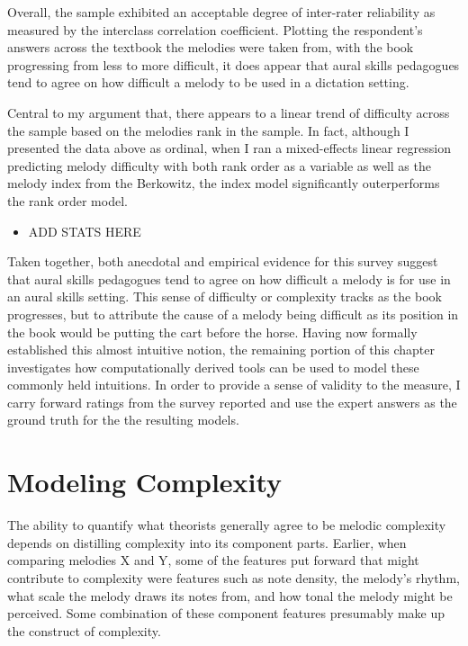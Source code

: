 \documentclass[]{book}
\providecommand{\tightlist}{%
  \setlength{\itemsep}{0pt}\setlength{\parskip}{0pt}}
\begin{document}
Overall, the sample exhibited an acceptable degree of inter-rater reliability as measured by the interclass correlation coefficient.
Plotting the respondent's answers across the textbook the melodies were taken from, with the book progressing from less to more difficult, it does appear that aural skills pedagogues tend to agree on how difficult a melody to be used in a dictation setting.

Central to my argument that, there appears to a linear trend of difficulty across the sample based on the melodies rank in the sample.
In fact, although I presented the data above as ordinal, when I ran a mixed-effects linear regression predicting melody difficulty with both rank order as a variable as well as the melody index from the Berkowitz, the index model significantly outerperforms the rank order model.

\begin{itemize}
\tightlist
\item
  ADD STATS HERE
\end{itemize}

Taken together, both anecdotal and empirical evidence for this survey suggest that aural skills pedagogues tend to agree on how difficult a melody is for use in an aural skills setting.
This sense of difficulty or complexity tracks as the book progresses, but to attribute the cause of a melody being difficult as its position in the book would be putting the cart before the horse.
Having now formally established this almost intuitive notion, the remaining portion of this chapter investigates how computationally derived tools can be used to model these commonly held intuitions.
In order to provide a sense of validity to the measure, I carry forward ratings from the survey reported and use the expert answers as the ground truth for the the resulting models.

\hypertarget{modeling-complexity}{%
\section{Modeling Complexity}\label{modeling-complexity}}

The ability to quantify what theorists generally agree to be melodic complexity depends on distilling complexity into its component parts.
Earlier, when comparing melodies X and Y, some of the features put forward that might contribute to complexity were features such as note density, the melody's rhythm, what scale the melody draws its notes from, and how tonal the melody might be perceived.
Some combination of these component features presumably make up the construct of complexity.
\end{document}
